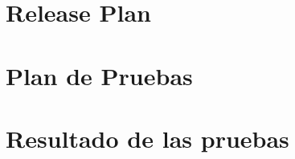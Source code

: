 \documentclass[onehalfspace]{USB}
\begin{document}




%
{}

\renewcommand\bibname{REFERENCIAS}

\appendix



\chapter{Release Plan}
% 


\chapter{Plan de Pruebas}


\chapter{Resultado de las pruebas}

\end{document}
